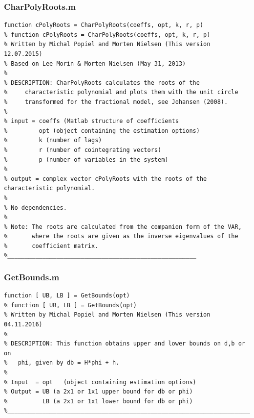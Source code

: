 \documentclass[10pt]{article}
\begin{document}
\subsubsection{CharPolyRoots.m}
\begin{lstlisting}[frame=single,caption={CharPolyRoots.m}]
function cPolyRoots = CharPolyRoots(coeffs, opt, k, r, p)
% function cPolyRoots = CharPolyRoots(coeffs, opt, k, r, p)
% Written by Michal Popiel and Morten Nielsen (This version 12.07.2015)
% Based on Lee Morin & Morten Nielsen (May 31, 2013)
%
% DESCRIPTION: CharPolyRoots calculates the roots of the 
%     characteristic polynomial and plots them with the unit circle 
%     transformed for the fractional model, see Johansen (2008).
% 
% input = coeffs (Matlab structure of coefficients
%         opt (object containing the estimation options)
%         k (number of lags)
%         r (number of cointegrating vectors)
%         p (number of variables in the system)
% 
% output = complex vector cPolyRoots with the roots of the characteristic polynomial.
% 
% No dependencies.
% 
% Note: The roots are calculated from the companion form of the VAR, 
%       where the roots are given as the inverse eigenvalues of the 
%       coefficient matrix.
%______________________________________________________
\end{lstlisting}

\subsubsection{GetBounds.m}
\begin{lstlisting}[frame=single,caption={GetBounds.m}]
function [ UB, LB ] = GetBounds(opt)
% function [ UB, LB ] = GetBounds(opt)
% Written by Michal Popiel and Morten Nielsen (This version 04.11.2016)
% 
% DESCRIPTION: This function obtains upper and lower bounds on d,b or on 
%   phi, given by db = H*phi + h. 
%
% Input  = opt   (object containing estimation options)
% Output = UB (a 2x1 or 1x1 upper bound for db or phi)
%          LB (a 2x1 or 1x1 lower bound for db or phi)
%_________________________________________________________________________
\end{lstlisting}
\end{document}

